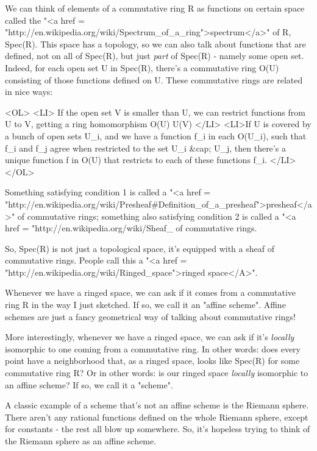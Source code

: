 We can think of elements of a commutative ring R as functions on
certain space called the "<a href =
"http://en.wikipedia.org/wiki/Spectrum_of_a_ring">spectrum</a>"
of R, Spec(R).  This space has a topology, so we can also talk about
functions that are defined, not on all of Spec(R), but just
\emph{part} of Spec(R) - namely some open set.  Indeed, for each
open set U in Spec(R), there's a commutative ring O(U) consisting of
those functions defined on U.  These commutative rings are related in
nice ways:

<OL>
<LI>
If the open set V is smaller than U, we can restrict functions from 
U to V, getting a ring homomorphism O(U) \to  U(V)
</LI>
<LI>If U is covered by a bunch of open sets U_{i}, and we have
a function f_{i} in each O(U_{i}), such that
f_{i} and f_{j} agree when restricted to the set
U_{i} &cap; U_{j}, then there's a unique function f in
O(U) that restricts to each of these functions f_{i}.  </LI>
</OL>

Something satisfying condition 1 is called a "<a href =
"http://en.wikipedia.org/wiki/Presheaf#Definition_of_a_presheaf">presheaf</a>"
of commutative rings; something also satisfying condition 2 is called
a "<a href =
"http://en.wikipedia.org/wiki/Sheaf_%
of commutative rings.

So, Spec(R) is not just a topological space, it's equipped with a
sheaf of commutative rings.  People call this a "<a href =
"http://en.wikipedia.org/wiki/Ringed_space">ringed space</A>".

Whenever we have a ringed space, we can ask if it comes from a
commutative ring R in the way I just sketched.  If so, we call it an
"affine scheme".  Affine schemes are just a fancy
geometrical way of talking about commutative rings!

More interestingly, whenever we have a ringed space, we can ask if
it's \emph{locally} isomorphic to one coming from a commutative ring.  
In other words: does every point have a neighborhood that, as a
ringed space, looks like Spec(R) for some commutative ring R?
Or in other words: is our ringed space \emph{locally} isomorphic to an
affine scheme?  If so, we call it a "scheme".  

A classic example of a scheme that's not an affine scheme is the
Riemann sphere.  There aren't any rational functions defined on the
whole Riemann sphere, except for constants - the rest all blow up 
somewhere.  So, it's hopeless trying to think of the Riemann sphere
as an affine scheme.


